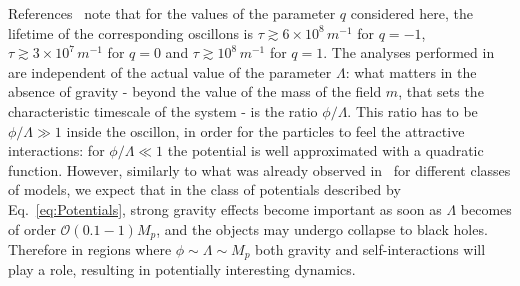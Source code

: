 \documentclass[11pt,a4paper]{article}
\begin{document}
References~\cite{1106.3335, 1906.06352, Zhang:2020bec} note that for the values of the parameter $q$ considered here, the lifetime of the corresponding oscillons is $\tau \gtrsim 6 \times 10^8 \, m^{-1}$ for $q=-1$, $\tau \gtrsim 3 \times 10^7 \, m^{-1}$ for $q=0$ and $\tau \gtrsim 10^8 \, m^{-1}$ for $q = 1$. The analyses performed in~\cite{1106.3335, 1906.06352, Zhang:2020bec} are independent of the actual value of the parameter $\Lambda$: what matters in the absence of gravity - beyond the value of the mass of the field $m$, that sets the characteristic timescale of the system - is the ratio $\phi/\Lambda$. This ratio has to be $\phi/\Lambda \gg 1$ inside the oscillon, in order for the particles to feel the attractive interactions: for $\phi/\Lambda \ll 1$ the potential is well approximated with a quadratic function. However, similarly to what was already observed in~\cite{1906.09346} for different classes of models, we expect that in the class of potentials described by Eq.~\eqref{eq:Potentials}, strong gravity effects become important as soon as $\Lambda$ becomes of order $\mathcal{O}(0.1-1) M_p$, and the objects may undergo collapse to black holes. Therefore in regions where $\phi \sim \Lambda \sim M_p$ both gravity and self-interactions will play a role, resulting in potentially interesting dynamics.
\end{document}
